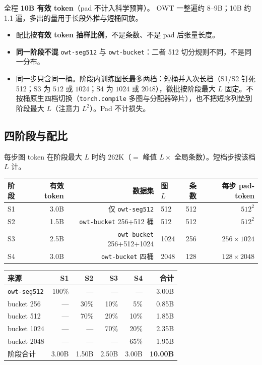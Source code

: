 \documentclass[UTF8,a4paper,11pt]{ctexart}
\begin{document}
全程 \textbf{10B 有效 token}（pad 不计入科学预算）。
OWT 一整遍约 8--9B；10B 约 1.1 遍，多出的量用于长段外推与短桶回放。

\begin{itemize}
  \item 配比按\textbf{有效 token 抽样比例}，不是条数、不是 pad 后张量长度。
  \item \textbf{同一阶段不混} \texttt{owt-seg512} 与 \texttt{owt-bucket}：二者 512 切分规则不同，不是同一分布。
  \item 同一步只含同一桶。阶段内训练图长最多两档：短桶并入次长档（S1/S2 钉死 512；S3 为 $512$ 或 $1024$；S4 为 $1024$ 或 $2048$），微批按阶段最大 $L$ 固定。不按桶原生四档切换（\texttt{torch.compile} 多图与分配器碎片），也不把短序列垫到阶段最大 $L$（注意力 $L^2$）。Pad 不计损失。
\end{itemize}

\subsection{四阶段与配比}

每步图 token 在阶段最大 $L$ 时约 $262\text{K}$（$=$ 峰值 $L \times$ 全局条数）。短档步按该档 $L$ 计。

\begin{center}
\small
\begin{tabular}{lrrlrr}
\toprule
阶段 & 有效 token & 数据集 & 图 $L$ & 条数 & 每步 pad-token \\
\midrule
S1 & 3.0B & 仅 \texttt{owt-seg512} & 512 & 512 & $512^2$ \\
S2 & 1.5B & \texttt{owt-bucket} 256+512 桶 & 512 & 512 & $512^2$ \\
S3 & 2.5B & \texttt{owt-bucket} 256+512+1024 & 1024 & 256 & $256{\times}1024$ \\
S4 & 3.0B & \texttt{owt-bucket} 四桶 & 2048 & 128 & $128{\times}2048$ \\
\bottomrule
\end{tabular}
\end{center}

\begin{center}
\small
\begin{tabular}{lrrrrr}
\toprule
来源 & S1 & S2 & S3 & S4 & 合计 \\
\midrule
\texttt{owt-seg512} & 100\% & --- & --- & --- & 3.00B \\
bucket 256 & --- & 30\% & 10\% & 5\% & 0.85B \\
bucket 512 & --- & 70\% & 20\% & 10\% & 1.85B \\
bucket 1024 & --- & --- & 70\% & 20\% & 2.35B \\
bucket 2048 & --- & --- & --- & 65\% & 1.95B \\
\midrule
阶段合计 & 3.00B & 1.50B & 2.50B & 3.00B & \textbf{10.00B} \\
\bottomrule
\end{tabular}
\end{center}
\end{document}

